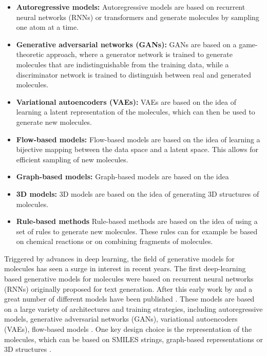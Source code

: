\begin{itemize}
    \item \textbf{Autoregressive models:} Autoregressive models are based on
    recurrent neural networks (RNNs) or transformers \citep{vaswaniAttentionAllYou2017}
    and generate molecules by sampling one atom at a time. 
    \item \textbf{Generative adversarial networks (GANs):} GANs are based on a
    game-theoretic approach, where a generator network is trained to generate
    molecules that are indistinguishable from the training data, while a
    discriminator network is trained to distinguish between real and generated
    molecules.
    \item \textbf{Variational autoencoders (VAEs):} VAEs are based on the idea
    of learning a latent representation of the molecules, which can then be used
    to generate new molecules. 
    \item \textbf{Flow-based models:} Flow-based models are based on the idea of
    learning a bijective mapping between the data space and a latent space. This
    allows for efficient sampling of new molecules.
    \item \textbf{Graph-based models:} Graph-based models are based on the idea
    \item \textbf{3D models:} 3D models are based on the idea of generating 3D
    structures of molecules.
    \item{\textbf{Rule-based methods}} Rule-based methods are based on the idea
    of using a set of rules to generate new molecules. These rules can for example
    be based on chemical reactions or on combining fragments of molecules.
\end{itemize}
    


Triggered by advances in deep learning, the field of generative models for
molecules has seen a surge in interest in recent years. The first deep-learning
based generative models for molecules were based on recurrent neural networks
(RNNs) originally proposed for text generation. After this early work by
\citep{seglerGeneratingFocusedMolecule2018} and
\citep{gomez-bombarelliAutomaticChemicalDesign2018} a great number of different
models have been published
\citep{eltonDeepLearningMolecular2019,sanchez-lengelingInverseMolecularDesign2018}.
These models are based on a large variety of architectures and training
strategies, including autoregressive models, generative adversarial networks
(GANs), variational autoencoders (VAEs), flow-based models
\citep{madhawaGraphNVPInvertibleFlow2019}. One key design choice is the
representation of the molecules, which can be based on SMILES strings,
graph-based representations or 3D structures
\citep{eltonDeepLearningMolecular2019,sanchez-lengelingInverseMolecularDesign2018,pangDeepGenerativeModels2024}.


